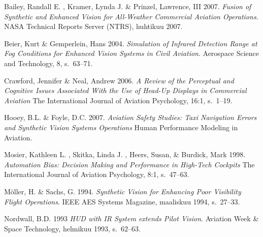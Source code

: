 \documentclass[utf8,bachelor,manualbib]{gradu3}
\begin{document}
\begin{thebibliography}{}



Bailey, Randall E. , Kramer, Lynda J. \& Prinzel, Lawrence, III 2007.
\textit{Fusion of Synthetic and Enhanced Vision for All-Weather Commercial Aviation Operations}.
NASA Technical Reports Server (NTRS), huhtikuu 2007.

Beier, Kurt \& Gemperlein, Hans 2004.
\textit{Simulation of Infrared Detection Range at Fog Conditions for Enhanced Vision Systems in Civil Aviation}.
Aerospace Science and Technology, 8, s.~63--71.

Crawford, Jennifer \& Neal, Andrew 2006.
\textit{A Review of the Perceptual and Cognitive Issues Associated With the Use of Head-Up Displays in Commercial Aviation}
The International Journal of Aviation Psychology, 16:1, s.~1--19.

Hooey, B.L. \& Foyle, D.C. 2007.
\textit{Aviation Safety Studies: Taxi Navigation Errors and Synthetic Vision Systems Operations}
Human Performance Modeling in Aviation.

Mosier, Kathleen L. , Skitka, Linda J. , Heers, Susan, \& Burdick, Mark 1998.
\textit{Automation Bias: Decision Making and Performance in High-Tech Cockpits}
The International Journal of Aviation Psychology, 8:1, s.~47--63.

Möller, H. \& Sachs, G. 1994.
\textit{Synthetic Vision for Enhancing Poor Visibility Flight Operations}.
IEEE AES Systems Magazine, maaliskuu 1994, s.~27--33.

Nordwall, B.D. 1993
\textit{HUD with IR System extends Pilot Vision}.
Aviation Week \& Space Technology, helmikuu 1993, s.~62--63.


\end{thebibliography}
\end{document}
